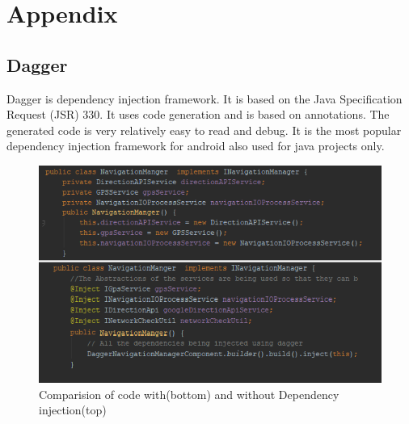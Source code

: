 \chapter{Appendix}
    \section{Dagger}
        \label{appendix:dagger}
        Dagger is dependency injection framework. It is based on the 
        Java Specification Request (JSR) 330. 
        It uses code generation and is based 
        on annotations. The generated code is very relatively easy to read 
        and debug. It is the most popular dependency injection framework
        for android also used for java projects only.


    \begin{figure}[htbp!]
        \centering \includegraphics{grafiken/di_compare.png}
        \caption{Comparision of code with(bottom) and without Dependency injection(top)}
        \label{fig:DIComparision}
    \end{figure}